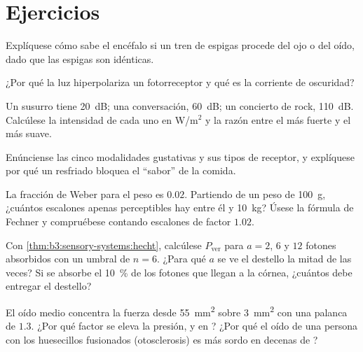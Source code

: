 \section{Ejercicios}

\begin{exercise}[$\star$]\label{exo:b3:sensory-systems:1}
Explíquese cómo sabe el encéfalo si un tren de espigas procede del ojo
o del oído, dado que las espigas son idénticas.
\end{exercise}

\begin{exercise}[$\star$]\label{exo:b3:sensory-systems:2}
¿Por qué la luz hiperpolariza un fotorreceptor y qué es la corriente de
oscuridad?
\end{exercise}

\begin{exercise}[$\star$]\label{exo:b3:sensory-systems:3}
Un susurro tiene \qty{20}{dB}; una conversación, \qty{60}{dB}; un
concierto de rock, \qty{110}{dB}. Calcúlese la intensidad de cada uno
en W/m$^{2}$ y la razón entre el más fuerte y el más suave.
\end{exercise}

\begin{exercise}[$\star$]\label{exo:b3:sensory-systems:4}
Enúnciense las cinco modalidades gustativas y sus tipos de receptor, y
explíquese por qué un resfriado bloquea el ``sabor'' de la comida.
\end{exercise}

\begin{exercise}[$\star\star$]\label{exo:b3:sensory-systems:5}
La fracción de Weber para el peso es $0.02$. Partiendo de un peso de
\qty{100}{g}, ¿cuántos escalones apenas perceptibles hay entre él y
\qty{10}{kg}? Úsese la fórmula de Fechner y compruébese contando
escalones de factor $1.02$.
\end{exercise}

\begin{exercise}[$\star\star$]\label{exo:b3:sensory-systems:6}
Con \cref{thm:b3:sensory-systems:hecht}, calcúlese $P_{\text{ver}}$ para
$a = 2$, $6$ y $12$ fotones absorbidos con un umbral de $n = 6$. ¿Para
qué $a$ se ve el destello la mitad de las veces? Si se absorbe el
\qty{10}{\%} de los fotones que llegan a la córnea, ¿cuántos debe
entregar el destello?
\end{exercise}

\begin{exercise}[$\star\star$]\label{exo:b3:sensory-systems:7}
El oído medio concentra la fuerza desde \qty{55}{mm^2} sobre
\qty{3}{mm^2} con una palanca de $1.3$. ¿Por qué factor se eleva la
presión, y en ? ¿Por qué el oído de una persona con los
huesecillos fusionados (otosclerosis) es más sordo en decenas de
?
\end{exercise}

